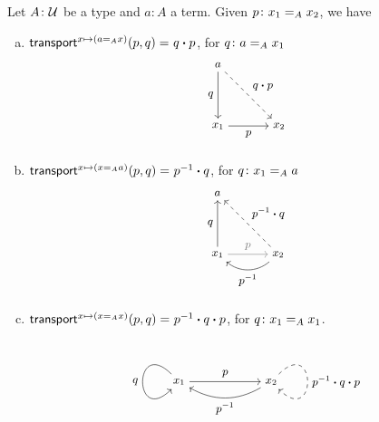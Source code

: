 \begin{prop}\label{prop:transport-decomposition-for-paths}
    Let\/ $A\colon\univ$ be a type and\/ $a\colon A$ a term. Given\/ $p\colon x_1\eq Ax_2$, we have
    \begin{enumerate}[a),font=\upshape]
        \item $\mathsf{transport}^{x\mapsto(a\mathrel{=_{A}}x)}(p,q)
            \mathrel{=_{}}q\mathbin{\boldsymbol{\cdot}} p$, for $q\colon a\eq Ax_1$
        \[
            \begin{tikzpicture}[x=1.7cm,y=1.7cm,font=\small]
                \node (a)  at (0,1) {$a$};
                \node (x1) at (0,0) {$x_1$};
                \node (x2) at (1,0) {$x_2$};
        
                \draw[->] (a)  -- node[left] {$q$} (x1);
                \draw[->] (x1) -- node[below] {$p$} (x2);
                \draw[->, dashed] (a) -- node[above right] {$q\ct p$} (x2);
            \end{tikzpicture}
        \]
        \item $\mathsf{transport}^{x\mapsto(x\mathrel{=_{A}}a)}(p,q)
            \mathrel{=_{}}p^{-1}\mathbin{\boldsymbol{\cdot}} q$, for $q\colon x_1\eq Aa$
        \[
            \begin{tikzpicture}[x=1.7cm,y=1.7cm,font=\small]
                \node (a)  at (0,1) {$a$};
                \node (x1) at (0,0) {$x_1$};
                \node (x2) at (1,0) {$x_2$};
        
                \draw[->] (x1) -- node[left] {$q$} (a);
                \draw[->,gray] (x1) -- node[above] {$p$} (x2);
                \draw[->, bend left=40] (x2) to node[below] {$p^{-1}$} (x1);
                \draw[->, dashed] (x2) -- node[above right] {$p^{-1}\ct q$} (a);
            \end{tikzpicture}
        \]
        \item $\mathsf{transport}^{x\mapsto(x\mathrel{=_{A}}x)}(p,q)
            \mathrel{=_{}}p^{-1}\mathbin{\boldsymbol{\cdot}} q\mathbin{\boldsymbol{\cdot}} p$, for $q\colon x_1\eq Ax_1$.
        \[
            \begin{tikzpicture}[x=1.7cm,y=1.7cm,font=\small]
                \node (x1) at (0,0) {$x_1$};
                \node (x2) at (1.5,0) {$x_2$};
        
                \draw[->] (x1) -- node[above] {$p$} (x2);
                \draw[->, bend left=30] (x2) to node[below] {$p^{-1}$} (x1);
                \draw[->] (x1) .. controls (-0.75, 0.75) and (-0.75, -0.75) .. node[left] {$q$} (x1);
                \draw[->, dashed] (x2) .. controls (2.25, 0.75) and (2.25, -0.75) .. node[right] {$p^{-1}\ct q\ct p$} (x2);
            \end{tikzpicture}
        \]
    \end{enumerate}
    
\end{prop}

